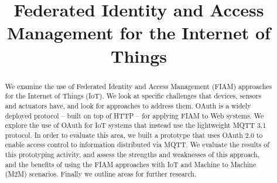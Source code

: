 \documentclass{IEEEtran}
\begin{document}
%
\title{Federated Identity and Access Management for the Internet of Things}
%
%


\author{
\emph{
}}



%


\maketitle              %

\begin{abstract}
We examine the use of Federated Identity and Access Management (FIAM) approaches for the Internet of Things (IoT).
We look at specific challenges that devices, sensors and actuators have, and look for approaches to address them.
OAuth is a widely deployed protocol -- built on top of HTTP -- for applying FIAM to Web systems. We explore the use of OAuth for IoT systems that 
instead use the lightweight MQTT 3.1 protocol. 
In order to evaluate this area, we built a prototype that uses OAuth 2.0 to enable access control 
to information distributed via MQTT. We evaluate the results of this prototyping activity, 
and assess the strengths and weaknesses of this approach, and the benefits of using 
the FIAM approaches with IoT and Machine to Machine (M2M) scenarios. 
Finally we outline areas for further research.
\end{abstract}
\end{document}
